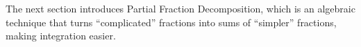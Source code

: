 
The next section introduces Partial Fraction Decomposition, which is an algebraic technique that turns ``complicated'' fractions into sums of ``simpler'' fractions, making integration easier.




